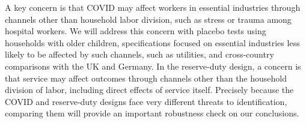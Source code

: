 \documentclass[12pt]{article}
\begin{document}
A key concern is that COVID may affect workers in essential industries through channels other than household labor division, such as stress or trauma among hospital workers. We will address this concern with placebo tests using households with older children, specifications focused on essential industries less likely to be affected by such channels, such as utilities, and cross-country comparisons with the UK and Germany. In the reserve-duty design, a concern is that service may affect outcomes through channels other than the household division of labor, including direct effects of service itself. Precisely because the COVID and reserve-duty designs face very different threats to identification, comparing them will provide an important robustness check on our conclusions.

\newpage

\printbibliography
\end{document}
